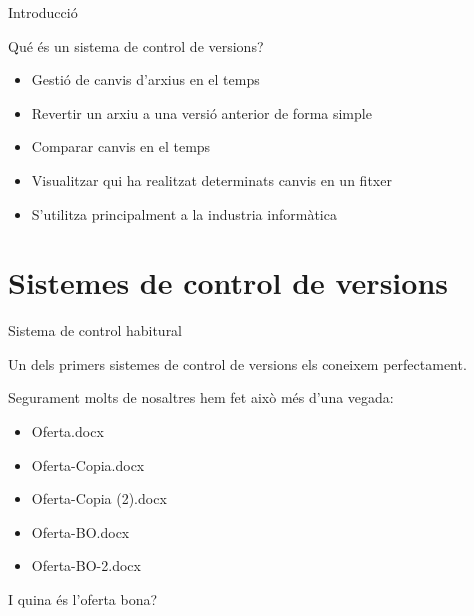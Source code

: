 \documentclass[10pt,xcolor={rgb}]{beamer}
\begin{document}
    \begin{frame}[fragile]{Introducció}

      \begin{block}{Qué és un sistema de control de versions?}
        \begin{itemize}
          \item Gestió de canvis d'arxius en el temps
          \item Revertir un arxiu a una versió anterior de forma simple
          \item Comparar canvis en el temps
          \item Visualitzar qui ha realitzat determinats canvis en un fitxer
          \item S'utilitza principalment a la industria informàtica
        \end{itemize}
      \end{block}
      
    \end{frame}

    \section{Sistemes de control de versions}
    
    \begin{frame}[fragile]{Sistema de control habitural}

      Un dels primers sistemes de control de versions els coneixem perfectament. 
      \begin{block}{Segurament molts de nosaltres hem fet això més d'una vegada:}
      \begin{itemize}
        \item Oferta.docx
        \item Oferta-Copia.docx
        \item Oferta-Copia (2).docx
        \item Oferta-BO.docx
        \item Oferta-BO-2.docx
      \end{itemize}
      \end{block}
      I quina és l'oferta bona?
    \end{frame}
\end{document}
